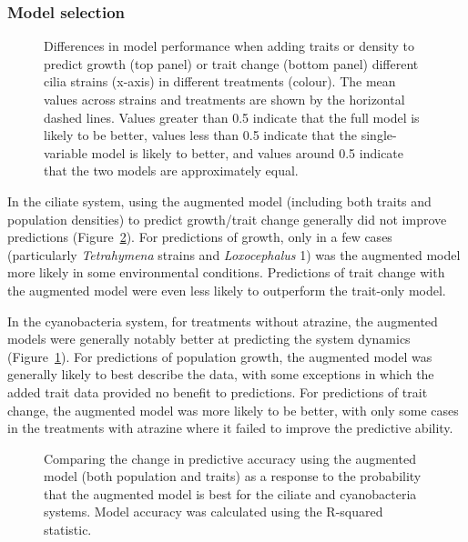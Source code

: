 \documentclass[
  letterpaper,
  DIV=11,
  numbers=noendperiod]{scrartcl}
\begin{document}
\subsubsection{Model selection}\label{model-selection}

\begin{figure}


\caption{\label{fig-AIC}Differences in model performance when adding
traits or density to predict growth (top panel) or trait change (bottom
panel) different cilia strains (x-axis) in different treatments
(colour). The mean values across strains and treatments are shown by the
horizontal dashed lines. Values greater than 0.5 indicate that the full
model is likely to be better, values less than 0.5 indicate that the
single-variable model is likely to better, and values around 0.5
indicate that the two models are approximately equal.}

\end{figure}%

In the ciliate system, using the augmented model (including both traits
and population densities) to predict growth/trait change generally did
not improve predictions (Figure~\ref{fig-AIC-deltaerror}). For
predictions of growth, only in a few cases (particularly
\emph{Tetrahymena} strains and \emph{Loxocephalus} 1) was the augmented
model more likely in some environmental conditions. Predictions of trait
change with the augmented model were even less likely to outperform the
trait-only model.

In the cyanobacteria system, for treatments without atrazine, the
augmented models were generally notably better at predicting the system
dynamics (Figure~\ref{fig-AIC}). For predictions of population growth,
the augmented model was generally likely to best describe the data, with
some exceptions in which the added trait data provided no benefit to
predictions. For predictions of trait change, the augmented model was
more likely to be better, with only some cases in the treatments with
atrazine where it failed to improve the predictive ability.

\begin{figure}


\caption{\label{fig-AIC-deltaerror}Comparing the change in predictive
accuracy using the augmented model (both population and traits) as a
response to the probability that the augmented model is best for the
ciliate and cyanobacteria systems. Model accuracy was calculated using
the R-squared statistic.}

\end{figure}%
\end{document}
